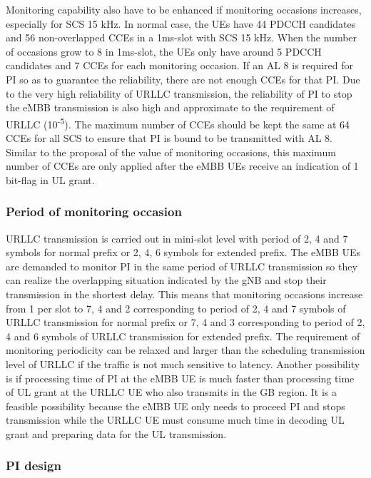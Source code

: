 \documentclass{ieeeaccess}
\begin{document}
Monitoring capability also have to be enhanced if monitoring occasions increases, especially for SCS 15 kHz. In normal case, the UEs have 44 PDCCH candidates and 56 non-overlapped CCEs in a 1ms-slot with SCS 15 kHz. When the number of occasions grow to 8 in 1ms-slot, the UEs only have around 5 PDCCH candidates and 7 CCEs for each monitoring occasion. If an AL 8 is required for PI so as to guarantee the reliability, there are not enough CCEs for that PI. Due to the very high reliability of URLLC transmission, the reliability of PI to stop the eMBB transmission is also high and approximate to the requirement of URLLC (10\textsuperscript{-5}). The maximum number of CCEs should be kept the same at 64 CCEs for all SCS to ensure that PI is bound to be transmitted with AL 8. Similar to the proposal of the value of monitoring occasions, this maximum number of CCEs are only applied after the eMBB UEs receive an indication of 1 bit-flag in UL grant.

\subsubsection{Period of monitoring occasion}
URLLC transmission is carried out in mini-slot level with period of 2, 4 and 7 symbols for normal prefix or 2, 4, 6 symbols for extended prefix. The eMBB UEs are demanded to monitor PI in the same period of URLLC transmission so they can realize the overlapping situation indicated by the gNB and stop their transmission in the shortest delay. This means that monitoring occasions increase from 1 per slot to 7, 4 and 2 corresponding to period of 2, 4 and 7 symbols of URLLC transmission for normal prefix or 7, 4 and 3 corresponding to period of 2, 4 and 6 symbols of URLLC transmission for extended prefix.
The requirement of monitoring periodicity can be relaxed and larger than the scheduling transmission level of URLLC if the traffic is not much sensitive to latency. Another possibility is if processing time of PI at the eMBB UE is much faster than processing time of UL grant at the URLLC UE who also transmits in the GB region. It is a feasible possibility because the eMBB UE only needs to proceed PI and stops transmission while the URLLC UE must consume much time in decoding UL grant and preparing data for the UL transmission.

\subsubsection {PI design}
\end{document}
